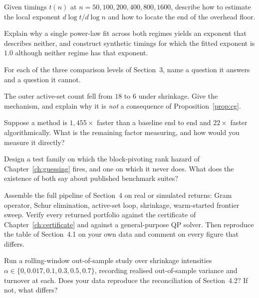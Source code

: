 \begin{exercises}

\begin{exercise}
Given timings $t(n)$ at $n = 50, 100, 200, 400, 800, 1600$, describe how to estimate the
local exponent $d\log t/d\log n$ and how to locate the end of the overhead floor.
\end{exercise}

\begin{exercise}
Explain why a single power-law fit across both regimes yields an exponent that describes
neither, and construct synthetic timings for which the fitted exponent is $1.0$ although
neither regime has that exponent.
\end{exercise}

\begin{exercise}
For each of the three comparison levels of Section~3, name a question it answers and a
question it cannot.
\end{exercise}

\begin{exercise}
The outer active-set count fell from $18$ to $6$ under shrinkage. Give the mechanism, and
explain why it is \emph{not} a consequence of Proposition~\ref{prop:cg}.
\end{exercise}

\begin{exercise}
Suppose a method is $1{,}455\times$ faster than a baseline end to end and $22\times$
faster algorithmically. What is the remaining factor measuring, and how would you
measure it directly?
\end{exercise}

\begin{exercise}
Design a test family on which the block-pivoting rank hazard of
Chapter~\ref{ch:guessing} fires, and one on which it never does. What does the existence
of both say about published benchmark suites?
\end{exercise}

\begin{exercise}[Implementation]
Assemble the full pipeline of Section~4 on real or simulated returns: Gram operator,
Schur elimination, active-set loop, shrinkage, warm-started frontier sweep. Verify every
returned portfolio against the certificate of Chapter~\ref{ch:certificate} and against a
general-purpose QP solver. Then reproduce the table of Section~4.1 on your own data and
comment on every figure that differs.
\end{exercise}

\begin{exercise}[Implementation]
Run a rolling-window out-of-sample study over shrinkage intensities
$\alpha \in \{0, 0.017, 0.1, 0.3, 0.5, 0.7\}$, recording realised out-of-sample variance
and turnover at each. Does your data reproduce the reconciliation of Section~4.2? If not,
what differs?
\end{exercise}

\end{exercises}
